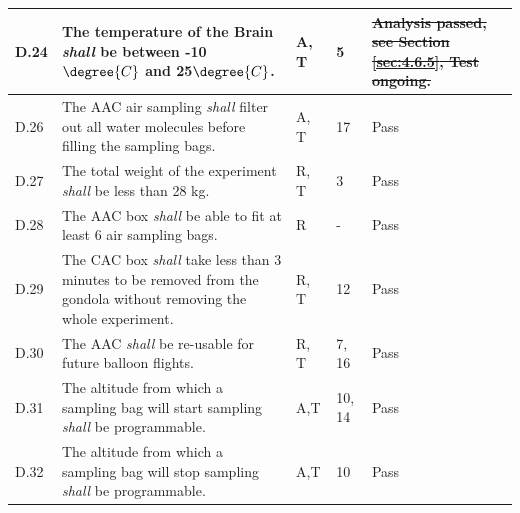 \documentclass[a4paper,12pt,oneside]{article}
\providecommand{\DIFaddtex}[1]{{\protect\color{blue}\uwave{#1}}} %
\providecommand{\DIFdeltex}[1]{{\protect\color{red}\sout{#1}}}                      %
\providecommand{\DIFaddbegin}{} %
\providecommand{\DIFaddend}{} %
\providecommand{\DIFdelbegin}{} %
\providecommand{\DIFdelend}{} %
\providecommand{\DIFadd}[1]{\texorpdfstring{\DIFaddtex{#1}}{#1}} %
\providecommand{\DIFdel}[1]{\texorpdfstring{\DIFdeltex{#1}}{}} %
\newcommand{\DIFscaledelfig}{0.5}
\newlength{\DIFdelgraphicswidth} %
\newlength{\DIFdelgraphicsheight} %
\newcommand{\DIFaddincludegraphics}[2][]{{\color{blue}\fbox{\DIFOincludegraphics[#1]{#2}}}} %
\newcommand{\DIFdelincludegraphics}[2][]{%
\sbox{\DIFdelgraphicsbox}{\DIFOincludegraphics[#1]{#2}}%
\settoboxwidth{\DIFdelgraphicswidth}{\DIFdelgraphicsbox} %
\settoboxtotalheight{\DIFdelgraphicsheight}{\DIFdelgraphicsbox} %
\scalebox{\DIFscaledelfig}{%
\parbox[b]{\DIFdelgraphicswidth}{\usebox{\DIFdelgraphicsbox}\\[-\baselineskip] \rule{\DIFdelgraphicswidth}{0em}}\llap{\resizebox{\DIFdelgraphicswidth}{\DIFdelgraphicsheight}{%
\setlength{\unitlength}{\DIFdelgraphicswidth}%
\begin{picture}(1,1)%
\thicklines\linethickness{2pt} %
{\color[rgb]{1,0,0}\put(0,0){\framebox(1,1){}}}%
{\color[rgb]{1,0,0}\put(0,0){\line( 1,1){1}}}%
{\color[rgb]{1,0,0}\put(0,1){\line(1,-1){1}}}%
\end{picture}%
}\hspace*{3pt}}} %
} %
\DeclareRobustCommand{\DIFaddbegin}{\DIFOaddbegin \let\includegraphics\DIFaddincludegraphics} %
\DeclareRobustCommand{\DIFaddend}{\DIFOaddend \let\includegraphics\DIFOincludegraphics} %
\DeclareRobustCommand{\DIFdelbegin}{\DIFOdelbegin \let\includegraphics\DIFdelincludegraphics} %
\DeclareRobustCommand{\DIFdelend}{\DIFOaddend \let\includegraphics\DIFOincludegraphics} %
\begin{document}
\begin{longtable}[]{|m{}| m{} |m{} |m{}|m{}|}
D.24 & The temperature of the Brain \textit{shall} be between -10$\degree{C}$ and 25$\degree{C}$.                                                                                                 &       A, T       & 5           & \DIFdelbegin \DIFdel{Analysis passed, see Section \ref{sec:4.6.5}, Test ongoing.       }\DIFdelend \DIFaddbegin \DIFadd{Pass       }\DIFaddend \\    \hline
D.26 & The AAC air sampling \textit{shall} filter out all water molecules before filling the sampling bags.                                                                             &        A, T      & 17            &  Pass       \\
\hline
D.27 & The total weight of the experiment \textit{shall} be less than 28 kg.
 & R, T & 3 & Pass \\\hline %
D.28 & The AAC box \textit{shall} be able to fit at least 6 air sampling bags. & R & - & Pass \\\hline %
D.29 &  The CAC box \textit{shall} take less than 3 minutes to be removed from the gondola without removing the whole experiment.
 & R, T & 12 & Pass\\\hline
 D.30 & The AAC \textit{shall} be re-usable for future balloon flights.                                                                           &        R, T      & 7, 16            & Pass  \\
\hline %
D.31  & The altitude from which a sampling bag will start sampling \textit{shall} be programmable. & A,T&  10, 14  & Pass\\ \hline
D.32  & The altitude from which a sampling bag will stop sampling \textit{shall} be programmable.& A,T & 10  & Pass\\ \hline


\end{longtable}
\end{document}
